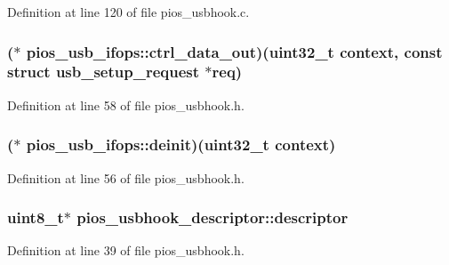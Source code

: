 Definition at line 120 of file pios\-\_\-usbhook.\-c.

\hypertarget{group___p_i_o_s___u_s_b_h_o_o_k_ga7fce932d233ec743f190170b5b277746}{
\subsubsection[{ctrl\-\_\-data\-\_\-out}]{($\ast$ pios\-\_\-usb\-\_\-ifops\-::ctrl\-\_\-data\-\_\-out)({\bf uint32\-\_\-t} context, {\bf const} struct {\bf usb\-\_\-setup\-\_\-request} $\ast${\bf req})}}\label{group___p_i_o_s___u_s_b_h_o_o_k_ga7fce932d233ec743f190170b5b277746}


Definition at line 58 of file pios\-\_\-usbhook.\-h.

\hypertarget{group___p_i_o_s___u_s_b_h_o_o_k_ga23c8bc133e24838b490c81a9d47318d4}{
\subsubsection[{deinit}]{($\ast$ pios\-\_\-usb\-\_\-ifops\-::deinit)({\bf uint32\-\_\-t} context)}}\label{group___p_i_o_s___u_s_b_h_o_o_k_ga23c8bc133e24838b490c81a9d47318d4}


Definition at line 56 of file pios\-\_\-usbhook.\-h.

\hypertarget{group___p_i_o_s___u_s_b_h_o_o_k_ga56ff6e20a77e4421c8c47442ca13d75b}{
\subsubsection[{descriptor}]{ {\bf uint8\-\_\-t}$\ast$ pios\-\_\-usbhook\-\_\-descriptor\-::descriptor}}\label{group___p_i_o_s___u_s_b_h_o_o_k_ga56ff6e20a77e4421c8c47442ca13d75b}


Definition at line 39 of file pios\-\_\-usbhook.\-h.

